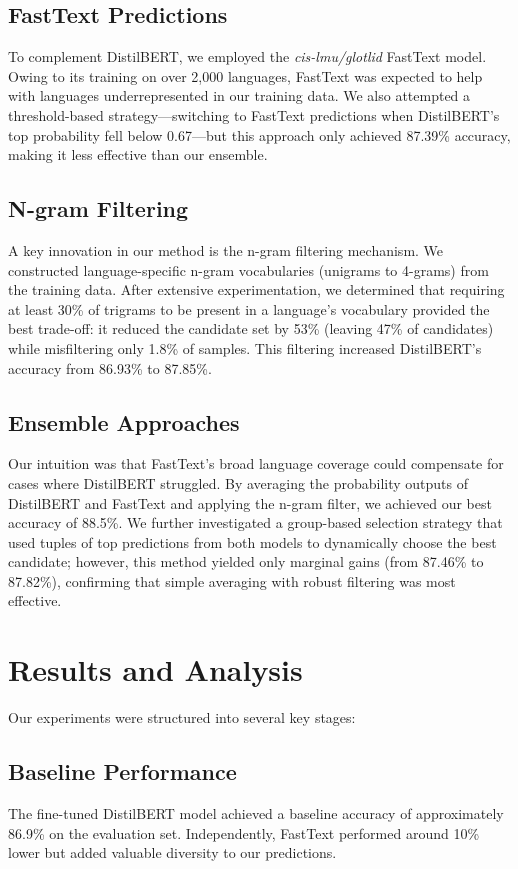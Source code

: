 \documentclass[11pt]{article}
\begin{document}
\subsection{FastText Predictions}
To complement DistilBERT, we employed the \textit{cis-lmu/glotlid} FastText model. Owing to its training on over 2,000 languages, FastText was expected to help with languages underrepresented in our training data. We also attempted a threshold-based strategy—switching to FastText predictions when DistilBERT's top probability fell below 0.67—but this approach only achieved 87.39\% accuracy, making it less effective than our ensemble.

\subsection{N-gram Filtering}
A key innovation in our method is the n-gram filtering mechanism. We constructed language-specific n-gram vocabularies (unigrams to 4-grams) from the training data. After extensive experimentation, we determined that requiring at least 30\% of trigrams to be present in a language's vocabulary provided the best trade-off: it reduced the candidate set by 53\% (leaving 47\% of candidates) while misfiltering only 1.8\% of samples. This filtering increased DistilBERT’s accuracy from 86.93\% to 87.85\%.

\subsection{Ensemble Approaches}
Our intuition was that FastText’s broad language coverage could compensate for cases where DistilBERT struggled. By averaging the probability outputs of DistilBERT and FastText and applying the n-gram filter, we achieved our best accuracy of 88.5\%. We further investigated a group-based selection strategy that used tuples of top predictions from both models to dynamically choose the best candidate; however, this method yielded only marginal gains (from 87.46\% to 87.82\%), confirming that simple averaging with robust filtering was most effective.

\section{Results and Analysis}
Our experiments were structured into several key stages:

\subsection{Baseline Performance}
The fine-tuned DistilBERT model achieved a baseline accuracy of approximately 86.9\% on the evaluation set. Independently, FastText performed around 10\% lower but added valuable diversity to our predictions.
\end{document}
